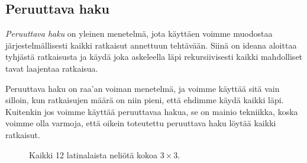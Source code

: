 \subsection{Peruuttava haku}

\emph{Peruuttava haku} on yleinen menetelmä,
jota käyttäen voimme muodostaa järjestelmällisesti
kaikki ratkaisut annettuun tehtävään.
Siinä on ideana aloittaa tyhjästä ratkaisusta ja käydä
joka askeleella läpi rekursiivisesti kaikki mahdolliset tavat laajentaa ratkaisua.

Peruuttava haku on raa'an voiman menetelmä,
ja voimme käyttää sitä vain silloin,
kun ratkaisujen määrä on niin pieni,
että ehdimme käydä kaikki läpi.
Kuitenkin jos voimme käyttää peruuttavaa hakua,
se on mainio tekniikka,
koska voimme olla varmoja, että oikein toteutettu
peruuttava haku löytää kaikki ratkaisut.

\begin{figure}
\center
{}
\caption{Kaikki 12 latinalaista neliötä kokoa $3 \times 3$.}
\label{fig:latnel}
\end{figure}

